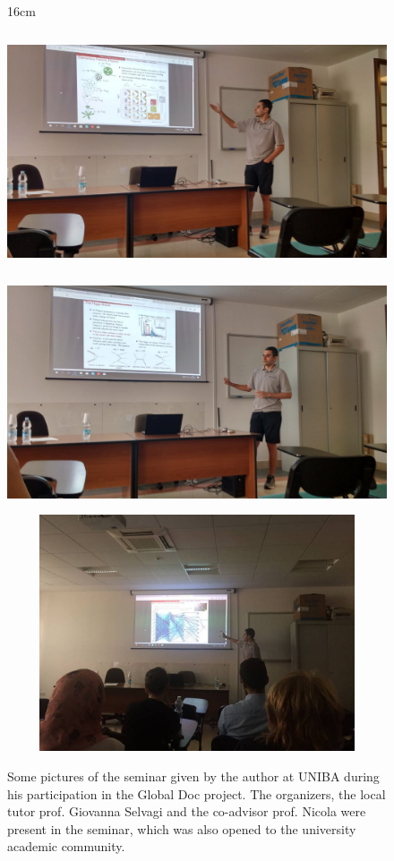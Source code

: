 \begin{figure}[htbp]{16cm}
	\caption{Some pictures of the seminar given by the author at UNIBA during his participation in the Global Doc project. The organizers, the local tutor prof. Giovanna Selvagi and the co-advisor prof. Nicola were present in the seminar, which was also opened to the university academic community.}
	\centering
	\includegraphics[width=12cm,height=7cm,trim={0cm 0cm 0cm 0cm},clip]{AppendixGlobalDocProject/figs/miqueias_globaldoc_seminar2}\\
	\includegraphics[width=12cm,height=7cm,trim={0cm 0cm 0cm 0cm},clip]{AppendixGlobalDocProject/figs/miqueias_globaldoc_seminar1}\\
	\includegraphics[width=12cm,height=7cm,trim={0cm 0cm 0cm 2cm},clip]{AppendixGlobalDocProject/figs/miqueias_globaldoc_seminar}
	\label{fig:global_doc_seminar}
\end{figure}

